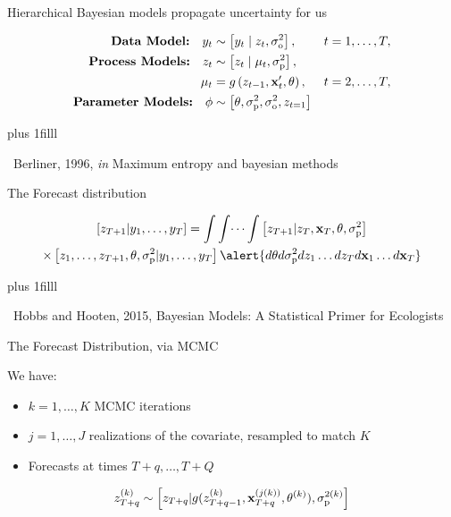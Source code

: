 \documentclass[12pt, compress, aspectratio=1610]{beamer}
\newcommand{\btVFill}{\vskip0pt plus 1filll}
\newcommand{\credit}[1]{\btVFill\par\hfill \footnotesize ~#1}
\begin{document}
\begin{frame}{%
\protect\hypertarget{hierarchical-bayesian-models-propagate-uncertainty-for-us}{%
Hierarchical Bayesian models propagate uncertainty for us}}

\begin{equation*}
\begin{aligned}[b]
\textbf{Data Model:} \quad y_t &\sim \left[y_t \;|\; z_t, \sigma^2_{\text{o}}\right], &t = 1,\dots,T, \\ 
\textbf{Process Models:} \quad z_t &\sim \left[z_t \;|\; \mu_t, \sigma^2_{\text{p}}\right],  \\ 
\mu_t &= g \left(z_{t-1},\textbf{x}'_t, \boldmath{\theta} \right), &t = 2,\dots,T, \\ 
\textbf{Parameter Models:} \quad \boldmath{\phi} &\sim \left[\boldmath{\theta},\sigma^2_{\text{p}},\sigma^2_{\text{o}},z_{t=1} \right]
\end{aligned}
\end{equation*}

\credit{Berliner, 1996, \emph{in} Maximum entropy and bayesian methods}

\end{frame}

\begin{frame}{%
\protect\hypertarget{the-forecast-distribution}{%
The Forecast distribution}}

\begin{equation*}
\begin{gathered}
\left[z_{T+1} | y_1,\dots,y_T \right] = \int \int \dots \int \left[z_{T+1} | z_T, \textbf{x}_T, \theta, \sigma^2_{\text{p}} \right] \\ \times \left[z_1,\dots,z_{T+1},\theta, \sigma^2_{\text{p}} | y_1,\dots,y_T \right] \alert{d \theta d \sigma^2_{\text{p}} d z_1 \dots d z_T d \textbf{x}_1 \dots d \textbf{x}_T}
\end{gathered}
\end{equation*}

\credit{Hobbs and Hooten, 2015, Bayesian Models: A Statistical Primer for Ecologists}

\end{frame}

\begin{frame}{%
\protect\hypertarget{the-forecast-distribution-via-mcmc}{%
The Forecast Distribution, via MCMC}}

We have:

\begin{itemize}
 \item $k = 1,\dots,K$ MCMC iterations
 \item $j = 1,\dots,J$ realizations of the covariate, resampled to match $K$
 \item Forecasts at times $T+q,\dots,T+Q$
\end{itemize}

\begin{equation*}
z_{T+q}^{(k)} \sim \left[z_{T+q} | g(z_{T+q-1}^{(k)}, \textbf{x}_{T+q}^{(j(k))},\boldmath{\theta}^{(k)}), \sigma^{2(k)}_{\text{p}} \right]
\end{equation*}

\end{frame}
\end{document}
